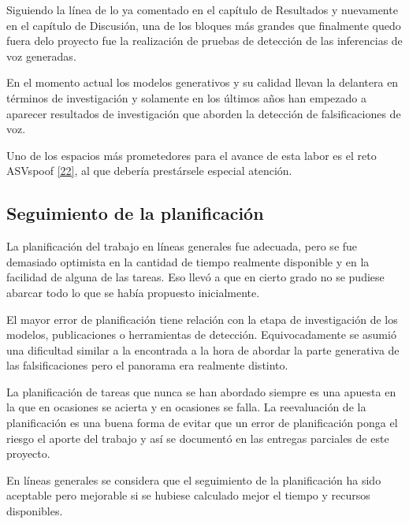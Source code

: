Siguiendo la línea de lo ya comentado en el capítulo de Resultados y nuevamente en el capítulo de Discusión, una de los bloques más grandes que finalmente quedo fuera delo proyecto fue la realización de pruebas de detección de las inferencias de voz generadas.

En el momento actual los modelos generativos y su calidad llevan la delantera en términos de investigación y solamente en los últimos años han empezado a aparecer resultados de investigación que aborden la detección de falsificaciones de voz.

Uno de los espacios más prometedores para el avance de esta labor es el reto ASVspoof \hyperref[CON_1]{[22]}, al que debería prestársele especial atención.


\subsection{Seguimiento de la planificación}

La planificación del trabajo en líneas generales fue adecuada, pero se fue demasiado optimista en la cantidad de tiempo realmente disponible y en la facilidad de alguna de las tareas. Eso llevó a que en cierto grado no se pudiese abarcar todo lo que se había propuesto inicialmente.

El mayor error de planificación tiene relación con la etapa de investigación de los modelos, publicaciones o herramientas de detección. Equivocadamente se asumió una dificultad similar a la encontrada a la hora de abordar la parte generativa de las falsificaciones pero el panorama era realmente distinto.

La planificación de tareas que nunca se han abordado siempre es una apuesta en la que en ocasiones se acierta y en ocasiones se falla. La reevaluación de la planificación es una buena forma de evitar que un error de planificación ponga el riesgo el aporte del trabajo y así se documentó en las entregas parciales de este proyecto.

En líneas generales se considera que el seguimiento de la planificación ha sido aceptable pero mejorable si se hubiese calculado mejor el tiempo y recursos disponibles.



\newpage 